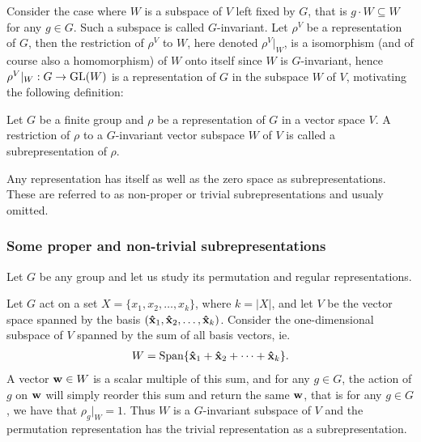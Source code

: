 Consider the case where $W$ is a subspace of $V$ left fixed by $G$, that is $g \cdot W \subseteq W$ for any $g \in G$. Such a subspace is called $G$-invariant. Let $\rho^V$ be a representation of $G$, then the restriction of $\rho^V$ to $W$, here denoted $\rho^V|_W$, is a isomorphism (and of course also a homomorphism) of $W$ onto itself since $W$ is $G$-invariant, hence $\rho^V|_W: G \rightarrow \text{GL}(W)$ is a representation of $G$ in the subspace $W$ of $V$, motivating the following definition:

\begin{definition}[Subrepresentation]\label{def:subrepr}
	Let $G$ be a finite group and $\rho$ be a representation of $G$ in a vector space $V$. A restriction of $\rho$ to a $G$-invariant vector subspace $W$ of $V$ is called a subrepresentation of $\rho$.
\end{definition}


\begin{example}
	Any representation has itself as well as the zero space as subrepresentations. These are referred to as non-proper or trivial subrepresentations and usualy omitted.
\end{example}

\subsubsection{Some proper and non-trivial subrepresentations}

Let $G$ be any group and let us study its permutation and regular representations. 

\begin{example}\cite[Example 1.4.3.]{Sagan}\label{example:trivpermrepr}
	Let $G$ act on a set $X = \{x_1, x_2, \dots, x_k\}$, where $k = |X|$, and let $V$ be the vector space spanned by the basis $(\mathbf{\hat{x}}_1, \mathbf{\hat{x}}_2, \dots, \mathbf{\hat{x}}_k)$. Consider the one-dimensional subspace of $V$ spanned by the sum of all basis vectors, ie. 
	\begin{align*}	
		W = \text{Span}\{ \mathbf{\hat{x}}_1 + \mathbf{\hat{x}}_2 + \dots + \mathbf{\hat{x}}_k \}.
	\end{align*}A vector $\mathbf{w} \in W$ is a scalar multiple of this sum, and for any $g \in G$, the action of $g$ on $\mathbf{w}$ will simply reorder this sum and return the same $\mathbf{w}$, that is for any $g \in G$, we have that $\rho_g|_W = 1$. Thus $W$ is a $G$-invariant subspace of $V$ and the permutation representation has the trivial representation as a subrepresentation.
\end{example}

